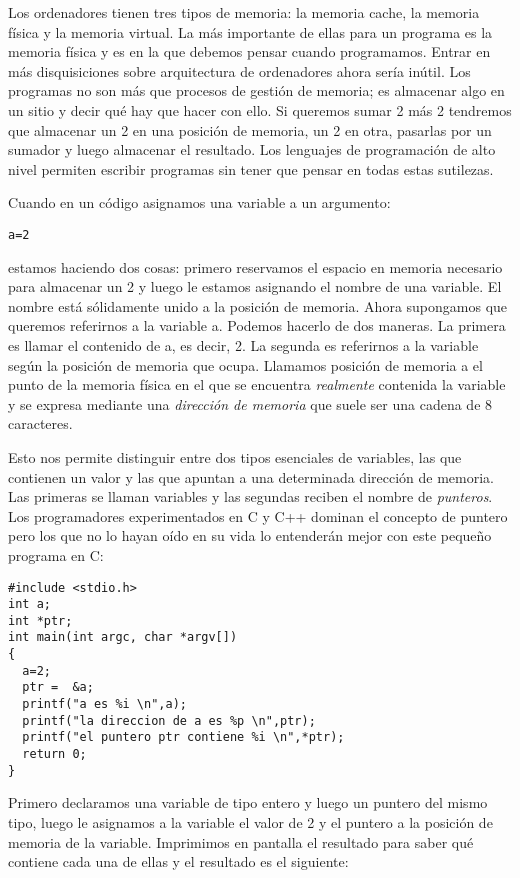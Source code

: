 Los ordenadores tienen tres tipos de memoria: la memoria cache, la
memoria física y la memoria virtual. La más importante de ellas para
un programa es la memoria física y es en la que debemos pensar cuando
programamos. Entrar en más disquisiciones sobre arquitectura de
ordenadores ahora sería inútil. Los programas no son más que procesos
de gestión de memoria; es almacenar algo en un sitio y decir qué hay
que hacer con ello. Si queremos sumar 2 más 2 tendremos que almacenar
un 2 en una posición de memoria, un 2 en otra, pasarlas por un sumador
y luego almacenar el resultado. Los lenguajes de programación de alto
nivel permiten escribir programas sin tener que pensar en todas estas
sutilezas.

Cuando en un código asignamos una variable a un argumento:

\begin{verbatim}
a=2
\end{verbatim}

estamos haciendo dos cosas: primero reservamos el espacio en memoria
necesario para almacenar un 2 y luego le estamos asignando el nombre
de una variable. El nombre está sólidamente unido a la posición de
memoria. Ahora supongamos que queremos referirnos a la variable a.
Podemos hacerlo de dos maneras. La primera es llamar el contenido de
a, es decir, 2. La segunda es referirnos a la variable según la
posición de memoria que ocupa. Llamamos posición de memoria a el punto
de la memoria física en el que se encuentra \emph{realmente} contenida
la variable y se expresa mediante una \emph{dirección de memoria} que
suele ser una cadena de 8 caracteres.

Esto nos permite distinguir entre dos tipos esenciales de variables,
las que contienen un valor y las que apuntan a una determinada
dirección de memoria. Las primeras se llaman variables y las segundas
reciben el nombre de \emph{punteros}. Los programadores experimentados
en C y C++ dominan el concepto de puntero pero los que no lo hayan
oído en su vida lo entenderán mejor con este pequeño programa en C:

\begin{verbatim}
#include <stdio.h>
int a;
int *ptr;
int main(int argc, char *argv[])
{
  a=2;
  ptr =  &a;
  printf("a es %i \n",a);
  printf("la direccion de a es %p \n",ptr);
  printf("el puntero ptr contiene %i \n",*ptr);
  return 0;
}
\end{verbatim}

Primero declaramos una variable de tipo entero y luego un puntero del
mismo tipo, luego le asignamos a la variable el valor de 2 y el
puntero a la posición de memoria de la variable. Imprimimos en
pantalla el resultado para saber qué contiene cada una de ellas y el
resultado es el siguiente:

